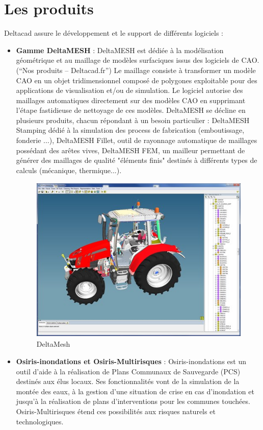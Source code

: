 \section{Les produits}
Deltacad assure le développement et le support de différents logiciels :
\begin{itemize}
\item \textbf{Gamme DeltaMESH} : DeltaMESH est dédiée à la modélisation géométrique et au maillage de modèles surfaciques issus des logiciels de \gls{CAO}. (“Nos produits – Deltacad.fr”) Le maillage consiste à transformer un modèle CAO en un objet tridimensionnel composé de polygones exploitable pour des applications de visualisation et/ou de simulation. Le logiciel autorise des maillages automatiques directement sur des modèles CAO en supprimant l’étape 
fastidieuse de nettoyage de ces modèles. DeltaMESH se décline en plusieurs 
produits, chacun répondant à un besoin particulier : DeltaMESH Stamping dédié 
à la simulation des process de fabrication (emboutissage, fonderie ...), 
DeltaMESH Fillet, outil de rayonnage automatique de maillages possédant des 
arêtes vives, DeltaMESH FEM, un mailleur permettant de générer des maillages 
de qualité "éléments finis" destinés à différents types de calculs (mécanique, thermique...).
\begin{figure}[H]
    \centering
    \includegraphics[height=8cm]{ressources/images/DeltaMesh.jpg}
    \caption{DeltaMesh}
\end{figure}

\item \textbf{Osiris-inondations et Osiris-Multirisques} : Osiris-inondations est un outil d'aide à la réalisation de Plans Communaux de Sauvegarde (PCS) destinés aux élus locaux. Ses fonctionnalités vont de la simulation de la montée des eaux, à la gestion d'une situation de crise en cas d'inondation et jusqu'à la réalisation de plans d'interventions pour les communes touchées. Osiris-Multirisques étend ces possibilités aux risques naturels et technologiques.


\end{itemize}
